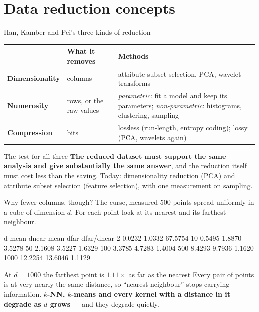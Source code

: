 \documentclass[aspectratio=169]{beamer}
\begin{document}
\section[Reduction]{Data reduction concepts}
\label{sec:reduce}

\begin{frame}[shrink=6]{Han, Kamber and Pei's three kinds of reduction}
  \begin{center}\small
  \begin{tabular}{@{}lp{4.6cm}p{4.4cm}@{}}
    \toprule
    & \textbf{What it removes} & \textbf{Methods}\\
    \midrule
    \textbf{Dimensionality} & columns &
      attribute subset selection, PCA, wavelet transforms\\[4pt]
    \textbf{Numerosity} & rows, or the raw values &
      \emph{parametric}: fit a model and keep its parameters;
      \emph{non-parametric}: histograms, clustering, sampling\\[4pt]
    \textbf{Compression} & bits &
      lossless (run-length, entropy coding); lossy (PCA, wavelets again)\\
    \bottomrule
  \end{tabular}
  \end{center}
  \vspace{0.3em}
  \begin{block}{The test for all three}
    \small \textbf{The reduced dataset must support the same analysis and
    give substantially the same answer}, and the reduction itself must cost
    less than the saving. Today: dimensionality reduction (PCA) and attribute
    subset selection (feature selection), with one measurement on sampling.
  \end{block}
\end{frame}

\begin{frame}[fragile,shrink=8]{Why fewer columns, though? The curse, measured}
$500$ points spread uniformly in a cube of dimension $d$. For each point look
at its nearest and its farthest neighbour.
\begin{outblk}
    d mean dnear  mean dfar     dfar/dnear
    2     0.0232     1.0332        67.5754
   10     0.5495     1.8870         3.5278
   50     2.1608     3.5227         1.6329
  100     3.3785     4.7283         1.4004
  500     8.4293     9.7936         1.1620
 1000    12.2254    13.6046         1.1129
\end{outblk}
\begin{alertblock}{At $d = 1000$ the farthest point is $1.11\times$ as far as the nearest}
  \footnotesize Every pair of points is at very nearly the same distance, so
  ``nearest neighbour'' stops carrying information. \textbf{$k$-NN, $k$-means
  and every kernel with a distance in it degrade as $d$ grows} --- and they
  degrade quietly.
\end{alertblock}
\end{frame}
\end{document}

